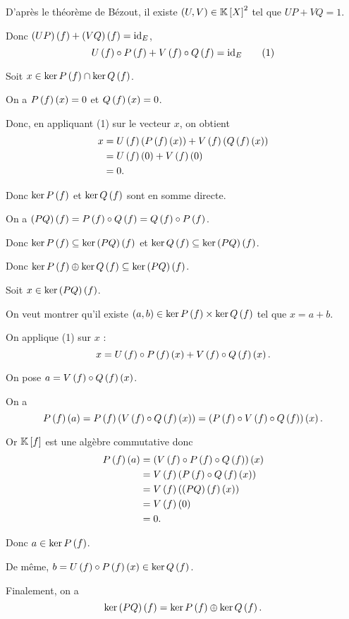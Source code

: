 \begin{dem}
D'après le théorème de Bézout, il existe \(\paren{U,V}\in\poly^2\) tel que \(UP+VQ=1\).

Donc \(\left(UP\right)\left(f\right)+\left(VQ\right)\left(f\right)=\mathrm{id}_{E}\), \ie \[U\left(f\right)\circ P\left(f\right)+V\left(f\right)\circ Q\left(f\right)=\mathrm{id}_{E}\qquad\text{(1)}\]

Soit \(x\in\ker P\left(f\right)\cap\ker Q\left(f\right)\).

On a \(P\left(f\right)\left(x\right)=0\) et \(Q\left(f\right)\left(x\right)=0\).

Donc, en appliquant (1) sur le vecteur \(x\), on obtient \[\begin{aligned}
x&=U\left(f\right)\left(P\left(f\right)\left(x\right)\right)+V\left(f\right)\left(Q\left(f\right)\left(x\right)\right) \\
&=U\left(f\right)\left(0\right)+V\left(f\right)\left(0\right) \\
&=0.
\end{aligned}\]

Donc \(\ker P\left(f\right)\) et \(\ker Q\left(f\right)\) sont en somme directe.

\increc

On a \(\left(PQ\right)\left(f\right)=P\left(f\right)\circ Q\left(f\right)=Q\left(f\right)\circ P\left(f\right)\).

Donc \(\ker P\left(f\right)\subseteq\ker\left(PQ\right)\left(f\right)\) et \(\ker Q\left(f\right)\subseteq\ker\left(PQ\right)\left(f\right)\).

Donc \(\ker P\left(f\right)\oplus\ker Q\left(f\right)\subseteq\ker\left(PQ\right)\left(f\right)\).

\incdir

Soit \(x\in\ker\left(PQ\right)\left(f\right)\).

On veut montrer qu'il existe \(\left(a,b\right)\in\ker P\left(f\right)\times\ker Q\left(f\right)\) tel que \(x=a+b\).

On applique (1) sur \(x\) : \[x=U\left(f\right)\circ P\left(f\right)\left(x\right)+V\left(f\right)\circ Q\left(f\right)\left(x\right).\]

On pose \(a=V\left(f\right)\circ Q\left(f\right)\left(x\right)\).

On a \[P\left(f\right)\left(a\right)=P\left(f\right)\left(V\left(f\right)\circ Q\left(f\right)\left(x\right)\right)=\left(P\left(f\right)\circ V\left(f\right)\circ Q\left(f\right)\right)\left(x\right).\]

Or \(\poly[\K][f]\) est une algèbre commutative donc \[\begin{aligned}
P\left(f\right)\left(a\right)&=\left(V\left(f\right)\circ P\left(f\right)\circ Q\left(f\right)\right)\left(x\right) \\
&=V\left(f\right)\left(P\left(f\right)\circ Q\left(f\right)\left(x\right)\right) \\
&=V\left(f\right)\left(\left(PQ\right)\left(f\right)\left(x\right)\right) \\
&=V\left(f\right)\left(0\right) \\
&=0.
\end{aligned}\]

Donc \(a\in\ker P\left(f\right)\).

De même, \(b=U\left(f\right)\circ P\left(f\right)\left(x\right)\in\ker Q\left(f\right)\).

Finalement, on a \[\ker\left(PQ\right)\left(f\right)=\ker P\left(f\right)\oplus\ker Q\left(f\right).\]
\end{dem}

